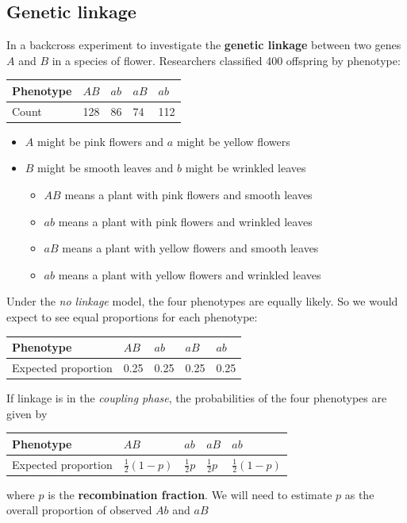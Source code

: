 \documentclass[a4paper]{article}
\begin{document}
\subsection{Genetic linkage}
In a backcross experiment to investigate the \textbf{genetic linkage} between two genes \( A \) and \( B \) in a species of flower. Researchers classified 400 offspring by phenotype:
\begin{table}[h]
	\centering
	\begin{tabular}{@{}lllll@{}}
	\textbf{Phenotype} & \( AB \) & \( ab \) & \( aB \) & \( ab \) \\ \midrule
	Count              & 128 & 86 & 74 & 112 \\ 
	\end{tabular}
\end{table}
\begin{itemize}
	\item \( A \) might be pink flowers and \( a \) might be yellow flowers
	\item \( B \) might be smooth leaves and \( b \) might be wrinkled leaves
	\begin{itemize}
		\item \( AB \) means a plant with pink flowers and smooth leaves
		\item \( ab \) means a plant with pink flowers and wrinkled leaves
		\item \( aB \) means a plant with yellow flowers and smooth leaves
		\item \( ab \) means a plant with yellow flowers and wrinkled leaves
	\end{itemize}
\end{itemize}
Under the \textit{no linkage} model, the four phenotypes are equally likely. So we would expect to see equal proportions for each phenotype:
\begin{table}[H]
	\centering
	\begin{tabular}{@{}lllll@{}}
	\textbf{Phenotype} 	& \( AB \) & \( ab \) & \( aB \) & \( ab \) \\ \midrule
	Expected proportion	& 0.25 & 0.25 & 0.25 & 0.25 \\ 
	\end{tabular}
\end{table}
If linkage is in the \textit{coupling phase}, the probabilities of the four phenotypes are given by
\begin{table}[H]
	\centering
	\begin{tabular}{@{}lllll@{}}
	\textbf{Phenotype} 	& \( AB \) & \( ab \) & \( aB \) & \( ab \) \\ \midrule
	Expected proportion & \( \frac{1}{2}(1-p) \) & \( \frac{1}{2}p \) & \( \frac{1}{2}p \) & \( \frac{1}{2}(1-p) \) \\ 
	\end{tabular}
\end{table}
where \( p \) is the \textbf{\textcolor{mygreen}{recombination fraction}}. We will need to estimate \( p \) as the overall proportion of observed \( Ab \) and \( aB \)
\end{document}
